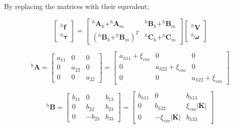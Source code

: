 \documentclass[12pt,a4paper,titlepage]{report}
\begin{document}
By replacing the matrices with their equvalent;

\[
\begin{bmatrix} ^{h}\bm{f}\\ 
^{h}\bm{\tau}\end{bmatrix}  = \begin{bmatrix} ^{h}\bm{A}_{h} + ^{h}\bm{A}_{m} & {^{h}\bm{B}_{h} + ^{h}\bm{B}_{m} }\\ 
({^{h}\bm{B}_{h} + ^{h}\bm{B}_{m} })^{T} & ^{h}\bm{C}_{h} + ^{h}\bm{C}_{m} \end{bmatrix}  \begin{bmatrix} ^{h}\bm{V}
 \\ ^{h}\bm{\omega}
\end{bmatrix}
\]



\begin{equation}
 ^{h}\bm{A} = \begin{bmatrix}
       a_{11}  & 0 		 & 0           \\[0.3em]
       0		 & a_{22}           & 0\\[0.3em]
       0           	& 0 		& a_{22}
     \end{bmatrix}
	=
	 \begin{bmatrix}
       a_{h11}+\xi_{vm}  & 0 		 & 0           \\[0.3em]
       0		 & a_{h22}+\xi_{vm}           & 0\\[0.3em]
       0           	& 0 		& a_{h22}+\xi_{vm}
     \end{bmatrix}
\label{A_finalmatrix}
\end{equation}


\begin{equation}
 ^{h}\bm{B} = \begin{bmatrix}
       b_{11}  & 0 		 & b_{13}        \\[0.3em]
       0		 & b_{22}           & b_{23}\\[0.3em]
       0           	& -b_{23}		& b_{33}
     \end{bmatrix}
	=
	  \begin{bmatrix}
       b_{h11}  & 0 		 & b_{h13}          \\[0.3em]
       0		 & b_{h22}           & \xi_{vm}|\bm{K}|       \\[0.3em]
       0           	& - \xi_{vm}|\bm{K}| 		& b_{h33}
     \end{bmatrix}
\label{B_finalmatrix}
\end{equation}
\end{document}
